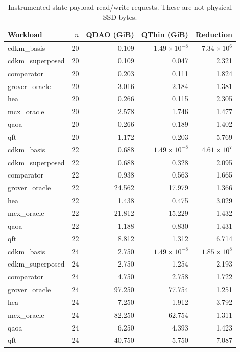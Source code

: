 \begin{table}[t]
\centering
\small
\caption{Instrumented state-payload read/write requests. These are not physical SSD bytes.}
\label{tab:qdao-qthin-traffic}
\begin{tabular}{lrrrr}
\hline
Workload & $n$ & QDAO (GiB) & QThin (GiB) & Reduction \\
\hline
cdkm\_basis & 20 & 0.109 & $1.49\times 10^{-8}$ & $7.34\times 10^{6}$ \\
cdkm\_superposed & 20 & 0.109 & 0.047 & 2.321 \\
comparator & 20 & 0.203 & 0.111 & 1.824 \\
grover\_oracle & 20 & 3.016 & 2.184 & 1.381 \\
hea & 20 & 0.266 & 0.115 & 2.305 \\
mcx\_oracle & 20 & 2.578 & 1.746 & 1.477 \\
qaoa & 20 & 0.266 & 0.189 & 1.402 \\
qft & 20 & 1.172 & 0.203 & 5.769 \\
cdkm\_basis & 22 & 0.688 & $1.49\times 10^{-8}$ & $4.61\times 10^{7}$ \\
cdkm\_superposed & 22 & 0.688 & 0.328 & 2.095 \\
comparator & 22 & 0.938 & 0.563 & 1.665 \\
grover\_oracle & 22 & 24.562 & 17.979 & 1.366 \\
hea & 22 & 1.438 & 0.475 & 3.029 \\
mcx\_oracle & 22 & 21.812 & 15.229 & 1.432 \\
qaoa & 22 & 1.188 & 0.830 & 1.431 \\
qft & 22 & 8.812 & 1.312 & 6.714 \\
cdkm\_basis & 24 & 2.750 & $1.49\times 10^{-8}$ & $1.85\times 10^{8}$ \\
cdkm\_superposed & 24 & 2.750 & 1.254 & 2.193 \\
comparator & 24 & 4.750 & 2.758 & 1.722 \\
grover\_oracle & 24 & 97.250 & 77.754 & 1.251 \\
hea & 24 & 7.250 & 1.912 & 3.792 \\
mcx\_oracle & 24 & 82.250 & 62.754 & 1.311 \\
qaoa & 24 & 6.250 & 4.393 & 1.423 \\
qft & 24 & 40.750 & 5.750 & 7.087 \\
\hline
\end{tabular}
\end{table}

